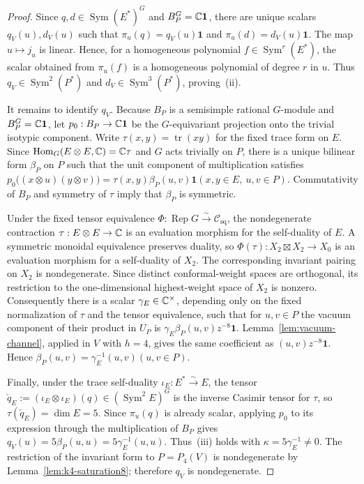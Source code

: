 \documentclass[10pt,a4paper]{amsart}
\numberwithin{equation}{section} \newtheorem{thm}{Theorem}[section] \newtheorem{lem}[thm]{Lemma} \newtheorem{ex}[thm]{Example} \newtheorem{prop}[thm]{Proposition} \newtheorem{cor}[thm]{Corollary} \newtheorem{defi}[thm]{Definition} \newtheorem{rmk}[thm]{Remark} \newtheorem{notation}[thm]{Notation}
\newcommand{\one}{\mathbf{1}}
\newcommand{\Rep}{\operatorname{Rep}}
\newcommand{\Sym}{\operatorname{Sym}}
\newcommand{\Hom}{\operatorname{Hom}}
\newcommand{\Csq}{\mathcal C_{\mathrm{sq}}}
\begin{document}
\begin{proof}
Since $q,d\in\Sym(E^*)^G$ and $B_P^G=\C\one$, there are unique scalars $q_V(u),d_V(u)$ such that \(\pi_u(q)=q_V(u)\one\) and \(\pi_u(d)=d_V(u)\one\). The map $u\mapsto j_u$ is linear. Hence, for a homogeneous polynomial $f\in\Sym^r(E^*)$, the scalar obtained from $\pi_u(f)$ is a homogeneous polynomial of degree $r$ in $u$. Thus $q_V\in\Sym^2(P^*)$ and $d_V\in\Sym^3(P^*)$, proving~(ii).

It remains to identify $q_V$. Because $B_P$ is a semisimple rational $G$-module and $B_P^G=\C\one$, let $p_0:B_P\to\C\one$ be the $G$-equivariant projection onto the trivial isotypic component. Write $\tau(x,y)=\operatorname{tr}(xy)$ for the fixed trace form on $E$. Since \(\Hom_G(E\otimes E,\C)=\C\tau\) and $G$ acts trivially on $P$, there is a unique bilinear form $\beta_P$ on $P$ such that the unit component of multiplication satisfies \(p_0\bigl((x\otimes u)(y\otimes v)\bigr) =\tau(x,y)\beta_P(u,v)\one (x,y\in E,\ u,v\in P)\). Commutativity of $B_P$ and symmetry of $\tau$ imply that $\beta_P$ is symmetric.

Under the fixed tensor equivalence \(\Phi:\Rep G\overset\sim\longrightarrow\Csq\), the nondegenerate contraction $\tau:E\otimes E\to\mathbb{C}$ is an evaluation morphism for the self-duality of $E$. A symmetric monoidal equivalence preserves duality, so $\Phi(\tau):X_2\boxtimes X_2\to X_0$ is an evaluation morphism for a self-duality of $X_2$. The corresponding invariant pairing on $X_2$ is nondegenerate. Since distinct conformal-weight spaces are orthogonal, its restriction to the one-dimensional highest-weight space of $X_2$ is nonzero. Consequently there is a scalar $\gamma_E\in\mathbb{C}^\times$, depending only on the fixed normalization of $\tau$ and the tensor equivalence, such that for $u,v\in P$ the vacuum component of their product in $U_P$ is \(\gamma_E\beta_P(u,v)z^{-8}\one\). Lemma~\ref{lem:vacuum-channel}, applied in $V$ with $h=4$, gives the same coefficient as \((u,v)z^{-8}\one\). Hence \(\beta_P(u,v)=\gamma_E^{-1}(u,v) (u,v\in P).\)

Finally, under the trace self-duality $\iota_E:E^*\overset\sim\to E$, the tensor \(\check q_E:=(\iota_E\otimes\iota_E)(q)\in(\Sym^2E)^G\) is the inverse Casimir tensor for $\tau$, so \(\tau(\check q_E)=\dim E=5\). Since $\pi_u(q)$ is already scalar, applying $p_0$ to its expression through the multiplication of $B_P$ gives \(q_V(u)=5\beta_P(u,u)=5\gamma_E^{-1}(u,u).\) Thus~(iii) holds with $\kappa=5\gamma_E^{-1}\ne0$. The restriction of the invariant form to $P=P_4(V)$ is nondegenerate by Lemma~\ref{lem:k4-saturation8}; therefore $q_V$ is nondegenerate.
\end{proof}
\end{document}
